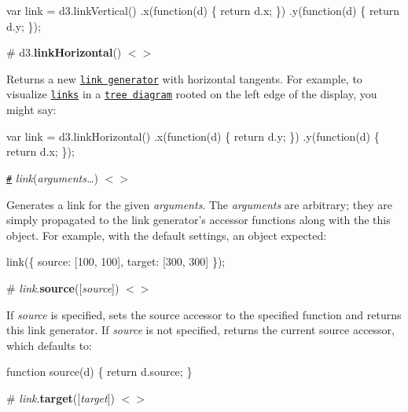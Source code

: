 \begin{DoxyCode}
var link = d3.linkVertical()
    .x(function(d) \{ return d.x; \})
    .y(function(d) \{ return d.y; \});
\end{DoxyCode}


\label{_linkHorizontal}%
\# d3.{\bfseries link\+Horizontal}() \href{https://github.com/d3/d3-shape/blob/master/src/link/index.js#L70}{\tt $<$$>$}

Returns a new \href{#_link}{\tt link generator} with horizontal tangents. For example, to visualize \href{https://github.com/d3/d3-hierarchy/blob/master/README.md#node_links}{\tt links} in a \href{https://github.com/d3/d3-hierarchy/blob/master/README.md#tree}{\tt tree diagram} rooted on the left edge of the display, you might say\+:


\begin{DoxyCode}
var link = d3.linkHorizontal()
    .x(function(d) \{ return d.y; \})
    .y(function(d) \{ return d.x; \});
\end{DoxyCode}


\href{#_link}{\tt \#} {\itshape link}({\itshape arguments…}) \href{https://github.com/d3/d3-shape/blob/master/src/link/index.js#L21}{\tt $<$$>$}

Generates a link for the given {\itshape arguments}. The {\itshape arguments} are arbitrary; they are simply propagated to the link generator’s accessor functions along with the {\ttfamily this} object. For example, with the default settings, an object expected\+:


\begin{DoxyCode}
link(\{
  source: [100, 100],
  target: [300, 300]
\});
\end{DoxyCode}


\label{_link_source}%
\# {\itshape link}.{\bfseries source}(\mbox{[}{\itshape source}\mbox{]}) \href{https://github.com/d3/d3-shape/blob/master/src/link/index.js#L28}{\tt $<$$>$}

If {\itshape source} is specified, sets the source accessor to the specified function and returns this link generator. If {\itshape source} is not specified, returns the current source accessor, which defaults to\+:


\begin{DoxyCode}
function source(d) \{
  return d.source;
\}
\end{DoxyCode}


\label{_link_target}%
\# {\itshape link}.{\bfseries target}(\mbox{[}{\itshape target}\mbox{]}) \href{https://github.com/d3/d3-shape/blob/master/src/link/index.js#L32}{\tt $<$$>$}

